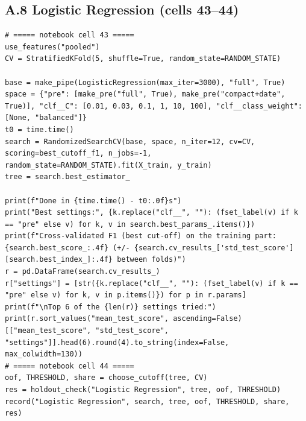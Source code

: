\documentclass[12pt,a4paper]{article}
\begin{document}
\subsection*{A.8 Logistic Regression (cells 43--44)}
\begin{lstlisting}[style=code]
# ===== notebook cell 43 =====
use_features("pooled")
CV = StratifiedKFold(5, shuffle=True, random_state=RANDOM_STATE)

base = make_pipe(LogisticRegression(max_iter=3000), "full", True)
space = {"pre": [make_pre("full", True), make_pre("compact+date", True)], "clf__C": [0.01, 0.03, 0.1, 1, 10, 100], "clf__class_weight": [None, "balanced"]}
t0 = time.time()
search = RandomizedSearchCV(base, space, n_iter=12, cv=CV, scoring=best_cutoff_f1, n_jobs=-1, random_state=RANDOM_STATE).fit(X_train, y_train)
tree = search.best_estimator_

print(f"Done in {time.time() - t0:.0f}s")
print("Best settings:", {k.replace("clf__", ""): (fset_label(v) if k == "pre" else v) for k, v in search.best_params_.items()})
print(f"Cross-validated F1 (best cut-off) on the training part: {search.best_score_:.4f} (+/- {search.cv_results_['std_test_score'][search.best_index_]:.4f} between folds)")
r = pd.DataFrame(search.cv_results_)
r["settings"] = [str({k.replace("clf__", ""): (fset_label(v) if k == "pre" else v) for k, v in p.items()}) for p in r.params]
print(f"\nTop 6 of the {len(r)} settings tried:")
print(r.sort_values("mean_test_score", ascending=False)[["mean_test_score", "std_test_score", "settings"]].head(6).round(4).to_string(index=False, max_colwidth=130))
# ===== notebook cell 44 =====
oof, THRESHOLD, share = choose_cutoff(tree, CV)
res = holdout_check("Logistic Regression", tree, oof, THRESHOLD)
record("Logistic Regression", search, tree, oof, THRESHOLD, share, res)
\end{lstlisting}
\end{document}
